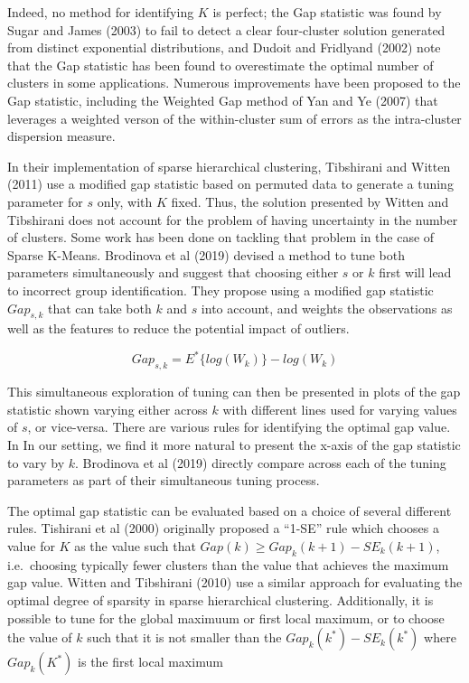 \documentclass[
]{article}
\begin{document}
Indeed, no method for identifying \(K\) is perfect; the Gap statistic
was found by Sugar and James (2003) to fail to detect a clear
four-cluster solution generated from distinct exponential distributions,
and Dudoit and Fridlyand (2002) note that the Gap statistic has been
found to overestimate the optimal number of clusters in some
applications. Numerous improvements have been proposed to the Gap
statistic, including the Weighted Gap method of Yan and Ye (2007) that
leverages a weighted verson of the within-cluster sum of errors as the
intra-cluster dispersion measure.

In their implementation of sparse hierarchical clustering, Tibshirani
and Witten (2011) use a modified gap statistic based on permuted data to
generate a tuning parameter for \(s\) only, with \(K\) fixed. Thus, the
solution presented by Witten and Tibshirani does not account for the
problem of having uncertainty in the number of clusters. Some work has
been done on tackling that problem in the case of Sparse K-Means.
Brodinova et al (2019) devised a method to tune both parameters
simultaneously and suggest that choosing either \(s\) or \(k\) first
will lead to incorrect group identification. They propose using a
modified gap statistic \(Gap_{s,k}\) that can take both \(k\) and \(s\)
into account, and weights the observations as well as the features to
reduce the potential impact of outliers.

\[Gap_{s,k} = E^*\{log(W_k)\} - log(W_k)\]

This simultaneous exploration of tuning can then be presented in plots
of the gap statistic shown varying either across \(k\) with different
lines used for varying values of \(s\), or vice-versa. There are various
rules for identifying the optimal gap value. In In our setting, we find
it more natural to present the x-axis of the gap statistic to vary by
\(k\). Brodinova et al (2019) directly compare across each of the tuning
parameters as part of their simultaneous tuning process.

The optimal gap statistic can be evaluated based on a choice of several
different rules. Tishirani et al (2000) originally proposed a ``1-SE''
rule which chooses a value for \(K\) as the value such that
\(Gap(k) \geq Gap_k(k+1) - SE_k(k+1)\), i.e.~choosing typically fewer
clusters than the value that achieves the maximum gap value. Witten and
Tibshirani (2010) use a similar approach for evaluating the optimal
degree of sparsity in sparse hierarchical clustering. Additionally, it
is possible to tune for the global maximuum or first local maximum, or
to choose the value of \(k\) such that it is not smaller than the
\(Gap_k(k^*)- SE_k(k^*)\) where \(Gap_k(K^*)\) is the first local
maximum
\end{document}
